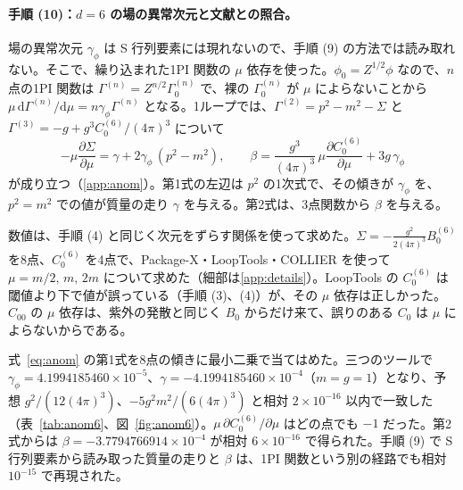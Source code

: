 \documentclass[a4paper,10pt]{ltjsarticle}
\newcommand{\dd}{\mathrm{d}}
\begin{document}
\paragraph{手順 (10)：$d=6$ の場の異常次元と文献との照合。}場の異常次元 $\gamma_\phi$ は S 行列要素には現れないので、手順 (9) の方法では読み取れない。そこで、繰り込まれた1PI 関数の $\mu$ 依存を使った。$\phi_0=Z^{1/2}\phi$ なので、$n$ 点の1PI 関数は $\Gamma^{(n)}=Z^{n/2}\Gamma^{(n)}_0$ で、裸の $\Gamma^{(n)}_0$ が $\mu$ によらないことから $\mu\,\dd\Gamma^{(n)}/\dd\mu=n\gamma_\phi\Gamma^{(n)}$ となる。1ループでは、$\Gamma^{(2)}=p^2-m^2-\Sigma$ と $\Gamma^{(3)}=-g+g^3C_0^{(6)}/(4\pi)^3$ について
\begin{equation}
-\mu\frac{\partial\Sigma}{\partial\mu}=\gamma+2\gamma_\phi\,(p^2-m^2),\qquad
\beta=\frac{g^3}{(4\pi)^3}\,\mu\frac{\partial C_0^{(6)}}{\partial\mu}+3g\,\gamma_\phi
\label{eq:anom}
\end{equation}
が成り立つ（\ref{app:anom}）。第1式の左辺は $p^2$ の1次式で、その傾きが $\gamma_\phi$ を、$p^2=m^2$ での値が質量の走り $\gamma$ を与える。第2式は、3点関数から $\beta$ を与える。

数値は、手順 (4) と同じく次元をずらす関係を使って求めた。$\Sigma=-\frac{g^2}{2(4\pi)^3}B_0^{(6)}$ を8点、$C_0^{(6)}$ を4点で、Package-X・LoopTools・COLLIER を使って $\mu=m/2,\,m,\,2m$ について求めた（細部は\ref{app:details}）。LoopTools の $C_0^{(6)}$ は閾値より下で値が誤っている（手順 (3)、(4)）が、その $\mu$ 依存は正しかった。$C_{00}$ の $\mu$ 依存は、紫外の発散と同じく $B_0$ からだけ来て、誤りのある $C_0$ は $\mu$ によらないからである。

式~\eqref{eq:anom} の第1式を8点の傾きに最小二乗で当てはめた。三つのツールで $\gamma_\phi=4.1994185460\times10^{-5}$、$\gamma=-4.1994185460\times10^{-4}$（$m=g=1$）となり、予想 $g^2/(12(4\pi)^3)$、$-5g^2m^2/(6(4\pi)^3)$ と相対 $2\times10^{-16}$ 以内で一致した（表~\ref{tab:anom6}、図~\ref{fig:anom6}）。$\mu\,\partial C_0^{(6)}/\partial\mu$ はどの点でも $-1$ だった。第2式からは $\beta=-3.7794766914\times10^{-4}$ が相対 $6\times10^{-16}$ で得られた。手順 (9) で S 行列要素から読み取った質量の走りと $\beta$ は、1PI 関数という別の経路でも相対 $10^{-15}$ で再現された。
\end{document}
